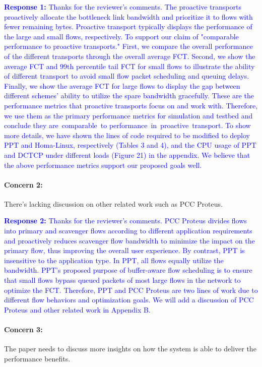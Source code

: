 \documentclass[12pt,one-column]{article}
\begin{document}
\noindent\textcolor{blue}{\textbf{Response 1:} 
Thanks for the reviewer's comments. 
The proactive transports proactively allocate the bottleneck link bandwidth and prioritize it to flows with fewer remaining bytes.
Proactive transport typically displays the performance of the large and small flows, respectively. 
To support our claim of "comparable performance to proactive transports."
First, we compare the overall performance of the different transports through the overall average FCT.
Second, we show the average FCT and 99th percentile tail FCT for small flows to illustrate the ability of different transport to avoid small flow packet scheduling and queuing delays.
Finally, we show the average FCT for large flows to display the gap between different schemes' ability to utilize the spare bandwidth gracefully.
These are the performance metrics that proactive transports focus on and work with.
Therefore, we use them as the primary performance metrics for simulation and testbed and conclude they are comparable to performance in proactive transport.
To show more details, we have shown the lines of code required to be modified to deploy PPT and Homa-Linux, respectively (Tables 3 and 4), and the CPU usage of PPT and DCTCP under different loads (Figure 21) in the appendix.
We believe that the above performance metrics support our proposed goals well.
  }

{\it \paragraph{Concern 2:} There's lacking discussion on other related work such as PCC Proteus.}



\noindent\textcolor{blue}{\textbf{Response 2:} 
Thanks for the reviewer's comments. 
PCC Proteus divides flows into primary and scavenger flows according to different application requirements and proactively reduces scavenger flow bandwidth to minimize the impact on the primary flow, thus improving the overall user experience.
By contrast, PPT is insensitive to the application type.
In PPT, all flows equally utilize the bandwidth.
PPT's proposed purpose of buffer-aware flow scheduling is to ensure that small flows bypass queued packets of most large flows in the network to optimize the FCT.
Therefore, PPT and PCC Proteus are two lines of work due to different flow behaviors and optimization goals.
We will add a discussion of PCC Proteus and other related work in Appendix B.
}

{\it \paragraph{Concern 3:} The paper needs to discuss more insights on how the system is able to deliver the performance benefits.}
\end{document}
